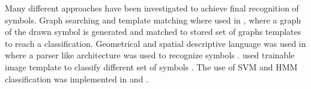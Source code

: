 \documentclass[a4paper,10pt]{IEEEconf}
\begin{document}
Many different approaches have been investigated to achieve final recognition of symbols. Graph searching and template matching where used in \cite{mulitstroke5,GraphBased07}, where  a graph of the drawn symbol is generated and matched to stored set of graphs templates to reach a classification. Geometrical and spatial descriptive language was used in \cite{SketchRead2007,Ladder30} where a parser like architecture was used to recognize symbols  . \citeauthor{imagetrainable48} used trainable image template to classify different set of symbols \cite{imagetrainable48} .  The use of SVM and HMM classification was implemented in \cite{SVM300,SmartSketch56} and \cite{HMM53}.\\%
\end{document}
